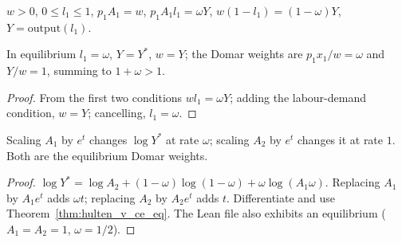 \begin{definition}
\label{def:hulten_v_ce}
\leanok
{}
$w > 0$, $0 \le l_1 \le 1$, $p_1 A_1 = w$, $p_1 A_1 l_1 = \omega Y$, $w(1 - l_1) = (1-\omega) Y$, $Y = \mathrm{output}(l_1)$.
\end{definition}

\begin{theorem}
\label{thm:hulten_v_ce_eq}
\leanok
{}
In equilibrium $l_1 = \omega$, $Y = Y^*$, $w = Y$; the Domar weights are $p_1 x_1/w = \omega$ and $Y/w = 1$, summing to
$1 + \omega > 1$.
\end{theorem}
\begin{proof}
\leanok
From the first two conditions $w l_1 = \omega Y$; adding the labour-demand condition, $w = Y$; cancelling, $l_1 = \omega$.
\end{proof}

\begin{theorem}
\label{thm:hulten_vertical}
\leanok
{}
Scaling $A_1$ by $e^t$ changes $\log Y^*$ at rate $\omega$; scaling $A_2$ by $e^t$ changes it at rate $1$. Both are the
equilibrium Domar weights.
\end{theorem}
\begin{proof}
\leanok
$\log Y^* = \log A_2 + (1-\omega)\log(1-\omega) + \omega \log(A_1 \omega)$. Replacing $A_1$ by $A_1 e^t$ adds $\omega t$;
replacing $A_2$ by $A_2 e^t$ adds $t$. Differentiate and use Theorem~\ref{thm:hulten_v_ce_eq}. The Lean file also
exhibits an equilibrium ($A_1 = A_2 = 1$, $\omega = 1/2$).
\end{proof}
